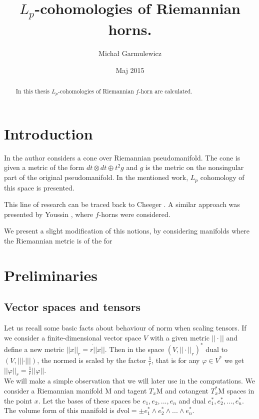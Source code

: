 \documentclass[licencjacka]{pracamgr}
\author{Michał Garmulewicz}
\title{$L_p$-cohomologies of Riemannian horns.}
\date{Maj 2015}
\theoremstyle{definition}
\theoremstyle{remark}
\begin{document}
\maketitle

\begin{abstract}
  In this thesis $L_p$-cohomologies of Riemannian $f$-horn are calculated.
\end{abstract}

\tableofcontents

\chapter{Introduction}

In \cite{weber} the author considers a cone over Riemannian
pseudomanifold.  The cone is given a metric of the form $dt \otimes dt
\oplus t^2 g$ and $g$ is the metric on the nonsingular part of the
original pseudomanifold. In the mentioned work, $L_p$ cohomology of
this space is presented.

This line of research can 
be traced back to Cheeger \cite{cheeger}. 
A similar approach was presented by Youssin \cite{youssin}, where $f$-horns
were considered.

 We present a slight modification of this notions, by considering
 manifolds where the Riemannian metric is of the for

\chapter{Preliminaries}
\section{Vector spaces and tensors}
Let us recall some basic facts about behaviour of norm when scaling tensors.
If we consider a finite-dimensional vector space $V$ with a given metric $||
\cdot ||$ and define a new metric $|| x ||_r  = r \dot || x ||$. Then in the
space $(V, || \cdot||_r)^\ast$ dual to $(V, ||| \cdot |||)$, the normed is scaled
by the factor $\frac{1}{r}$, that is for any $\varphi \in V^\ast$ we get
$||\varphi||_r = \frac{1}{r} ||\varphi|| $. \\

We will make a simple observation that we will later use in the
computations.  We consider a Riemannian manifold $\mathrm{M}$ and
tagent $T_x\mathrm{M}$ and cotangent $T_x^\ast\mathrm{M}$ spaces in
the point $x$.  Let the bases of these spaces be $e_1, e_2, ..., e_n$
and dual $e_1^\ast, e_2^\ast, ..., e_n^\ast$. The volume form of this
manifold is $d\mathrm{vol} = \pm e_1^\ast \wedge e_2^\ast \wedge
... \wedge e_n^\ast $. \\
\end{document}
